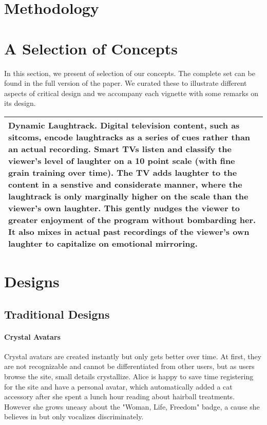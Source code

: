 \section{Methodology}


\section{A Selection of Concepts}

In this section, we present of selection of our concepts. The complete set can be found in the full version of the paper. We curated these to illustrate different aspects of critical design and we accompany each vignette with some remarks on its design.


\begin{tabular}{|p{}|}
\hline
\textbf{Dynamic Laughtrack.} Digital television content, such as sitcoms, encode laughtracks as a series of cues rather than an actual recording. Smart TVs listen and classify the viewer's level of laughter on a 10 point scale (with fine grain training over time). The TV adds laughter to the content in a senstive and considerate manner, where the laughtrack is only marginally higher on the scale than the viewer's own laughter. This gently nudges the viewer to greater enjoyment of the program without bombarding her. It also mixes in actual past recordings of the viewer's own laughter to capitalize on emotional mirroring. \\ \hline
\end{tabular}

\section{Designs}
\subsection{Traditional Designs}
\paragraph{Crystal Avatars}
Crystal avatars are created instantly but only gets better over time. At first, they are not recognizable and cannot be differentiated from other users, but as users browse the site, small details crystallize. Alice is happy to save time registering for the site and have a personal avatar, which automatically added a cat accessory after she spent a lunch hour reading about hairball treatments. However she grows uneasy about the "Woman, Life, Freedom" badge, a cause she believes in but only vocalizes discriminately. 

